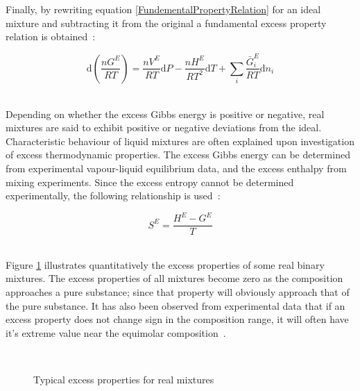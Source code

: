 Finally, by rewriting equation \ref{FundementalPropertyRelation} for an ideal mixture and subtracting it from the original a fundamental excess property relation is obtained~\cite{MolecularThermodynamicsOfFluidPhaseEquilibria, SmithNessAbbott}:\

\begin{equation}
\mathrm{d}\left(\frac{nG^{E}}{RT}\right) = \frac{nV^{E}}{RT}\mathrm{d}P - \frac{nH^{E}}{RT^{2}}\mathrm{d}T  + \sum_{i}\frac{\bar{G}^{E}_{i}}{RT}\mathrm{d}n_{i} \label{FundementalExcessPropertyRelation}
\end{equation}\
			

Depending on whether the excess Gibbs energy is positive or negative, real mixtures are said to exhibit positive or negative deviations from the ideal. Characteristic behaviour of liquid mixtures are often explained upon investigation of excess thermodynamic properties. The excess Gibbs energy can be determined from experimental vapour-liquid equilibrium data, and the excess enthalpy from mixing experiments. Since the excess entropy cannot be determined experimentally, the following relationship is used~\cite{SmithNessAbbott}:\

\begin{equation}
S^{E} = \frac{H^{E} - G^{E}}{T}
\end{equation}\

Figure \ref{ExcessPropertyDrawing} illustrates quantitatively the excess properties of some real binary mixtures. The excess properties of all mixtures become zero as the composition approaches a pure substance; since that property will obviously approach that of the pure substance. It has also been observed from experimental data that if an excess property does not change sign in the composition range, it will often have it's extreme value near the equimolar composition~\cite{SmithNessAbbott}.\

\begin{figure}[t]
\begin{center}
\resizebox{0.7\textwidth}{!}{}\\
\end{center}
\caption{Typical excess properties for real mixtures} \label{ExcessPropertyDrawing}
\end{figure}

